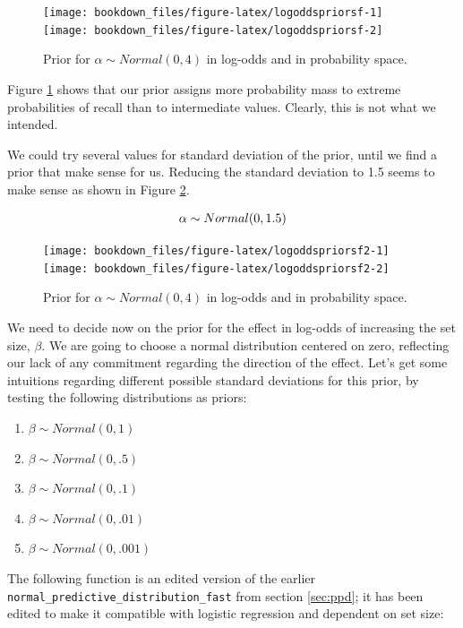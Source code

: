 \documentclass[12pt,]{krantz}
\providecommand{\tightlist}{%
  \setlength{\itemsep}{0pt}\setlength{\parskip}{0pt}}
\theoremstyle{definition}
\theoremstyle{definition}
\theoremstyle{definition}
\theoremstyle{remark}
\begin{document}
\begin{figure}
\texttt{[image: bookdown\_files/figure-latex/logoddspriorsf-1]} \texttt{[image: bookdown\_files/figure-latex/logoddspriorsf-2]} \caption{Prior for \(\alpha \sim Normal(0, 4)\) in log-odds and in probability space.}\label{fig:logoddspriorsf}
\end{figure}

Figure \ref{fig:logoddspriorsf} shows that our prior assigns more probability mass to extreme probabilities of recall than to intermediate values. Clearly, this is not what we intended.

We could try several values for standard deviation of the prior, until we find a prior that make sense for us. Reducing the standard deviation to 1.5 seems to make sense as shown in Figure \ref{fig:logoddspriorsf2}.

\begin{equation}
\alpha \sim Normal(0, 1.5) \\
\end{equation}



\begin{figure}
\texttt{[image: bookdown\_files/figure-latex/logoddspriorsf2-1]} \texttt{[image: bookdown\_files/figure-latex/logoddspriorsf2-2]} \caption{Prior for \(\alpha \sim Normal(0, 4)\) in log-odds and in probability space.}\label{fig:logoddspriorsf2}
\end{figure}

We need to decide now on the prior for the effect in log-odds of increasing the set size, \(\beta\). We are going to choose a normal distribution centered on zero, reflecting our lack of any commitment regarding the direction of the effect. Let's get some intuitions regarding different possible standard deviations for this prior, by testing the following distributions as priors:

\begin{enumerate}
\def\labelenumi{(\alph{enumi})}
\tightlist
\item
  \(\beta \sim Normal(0, 1)\)
\item
  \(\beta \sim Normal(0, .5)\)
\item
  \(\beta \sim Normal(0, .1)\)
\item
  \(\beta \sim Normal(0, .01)\)
\item
  \(\beta \sim Normal(0, .001)\)
\end{enumerate}

The following function is an edited version of the earlier \texttt{normal\_predictive\_distribution\_fast} from section \ref{sec:ppd}; it has been edited to make it compatible with logistic regression and dependent on set size:
\end{document}
